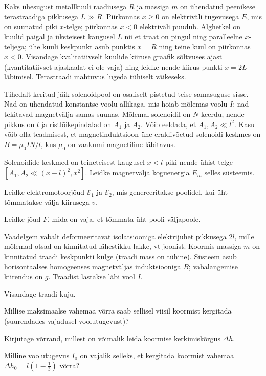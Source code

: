 \documentclass[a4paper,11pt,twocolumn]{article}
\begin{document}
\begin{question}[Lõppv 2018, G10]
    Kaks ühesugust metallkuuli raadiusega $R$ ja massiga $m$ on ühendatud peenikese terastraadiga pikkusega $L \gg R$.  Piirkonnas $x \ge 0$ on elektriväli tugevusega $E$, mis on suunatud piki $x$-telge; piirkonnas $x < 0$ elektriväli puudub. Alghetkel on kuulid paigal ja üksteisest kaugusel $L$ nii et traat on pingul ning paralleelne $x$-teljega; ühe kuuli keskpunkt asub punktis $x = R$ ning teine kuul on piirkonnas $x < 0$. Visandage kvalitatiivselt kuulide kiiruse graafik sõltvuses ajast (kvantitatiivset ajaskaalat ei ole vaja) ning leidke nende kiirus punkti $x = 2L$ läbimisel. Terastraadi mahtuvus lugeda tühiselt väikeseks.
\end{question}

\begin{question}[E-S 2015, P9]
    Tihedalt keritud jäik solenoidpool on osaliselt pistetud teise samasuguse sisse. Nad on ühendatud konstantse voolu allikaga, mis hoiab mõlemas voolu $I$; nad tekitavad magnetvälja samas suunas. Mõlemal solenoidil on $N$ keerdu, nende pikkus on $l$ ja ristlõikepindalad on $A_1$ ja $A_2$. Võib eeldada, et $A_1,A_2 \ll l^{2}$. Kasu võib olla teadmisest, et magnetinduktsioon ühe eraldivõetud solenoidi keskmes on $B = \mu_0 IN/l$, kus $\mu_0$ on vaakumi magnetiline läbitavus.
    \begin{subquestion}
    \item Solenoidide keskmed on teineteisest kaugusel $x < l$ piki nende ühist telge \( [A_1, A_2 \ll (x - l)^{2}, x^{2}] \). Leidke magnetvälja koguenergia $E_m$ selles süsteemis.
    \item Leidke elektromotoorjõud $\mathcal{E}_1$ ja $\mathcal{E}_2$, mis genereeritakse poolidel, kui üht tõmmatakse välja kiirusega $v$.
    \item Leidke jõud $F$, mida on vaja, et tõmmata üht pooli väljapoole.
    \end{subquestion}
\end{question}

\begin{question}[E-S 2012, P7][em4][1.6cm]
    Vaadelgem vabalt deformeeritavat isolatsiooniga elektrijuhet pikkusega \(2l\), mille mõlemad otsad on kinnitatud lähestikku lakke, vt joonist. Koormis massiga \(m\) on kinnitatud traadi keskpunkti külge (traadi mass on tühine). Süsteem asub horisontaalses homogeenses magnetväljas induktsiooniga \(B\); vabalangemise kiirendus on \(g\). Traadist lastakse läbi vool \(I\).
    \begin{subquestion}
    \item Visandage traadi kuju.
    \item Millise maksimaalse vahemaa võrra saab sellisel viisil koormist kergitada (suurendades vajadusel voolutugevust)?
    \item Kirjutage võrrand, millest on võimalik leida koormise kerkimiskõrgus \(\Delta h\).
    \item Milline voolutugevus \(I_0\) on vajalik selleks, et kergitada koormist vahemaa \(\Delta h_0=l\left(1-\frac{1}{3}\right)\) võrra?
    \end{subquestion}
\end{question}
\vspace{1em}
\end{document}
